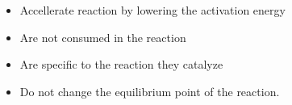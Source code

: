 \begin{itemize}
\item Accellerate reaction by lowering the activation energy
\item Are not consumed in the reaction
\item Are specific to the reaction they catalyze
\item Do not change the equilibrium point of the reaction.
\end{itemize}